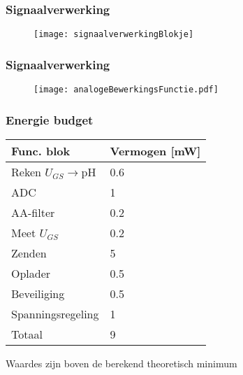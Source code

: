 \begin{frame}
    \frametitle{Signaalverwerking}

    \begin{figure}
        \centering
        \texttt{[image: signaalverwerkingBlokje]}
    \end{figure}

\end{frame}

\begin{frame}
    \frametitle{Signaalverwerking}

    \begin{figure}
        \centering
        \texttt{[image: analogeBewerkingsFunctie.pdf]}
    \end{figure}

\end{frame}

\begin{frame}
    \frametitle{Energie budget}
    \begin{table}[ht]
        \centering
        \begin{tabular}{l|l}
            Func. blok          & Vermogen [mW] \\
            \hline
            Reken $U_{GS}\rightarrow$pH & 0.6   \\
            ADC                 & 1             \\
            AA-filter           & 0.2           \\
            Meet $U_{GS}$       & 0.2           \\
            Zenden              & 5             \\
            Oplader             & 0.5           \\
            Beveiliging         & 0.5           \\
            Spanningsregeling   & 1             \\
            \hline
            \hline
            Totaal              & 9

        \end{tabular}
        \label{tab:energieBudgetEstimatie}
    \end{table}
    Waardes zijn boven de berekend theoretisch minimum
\end{frame}


